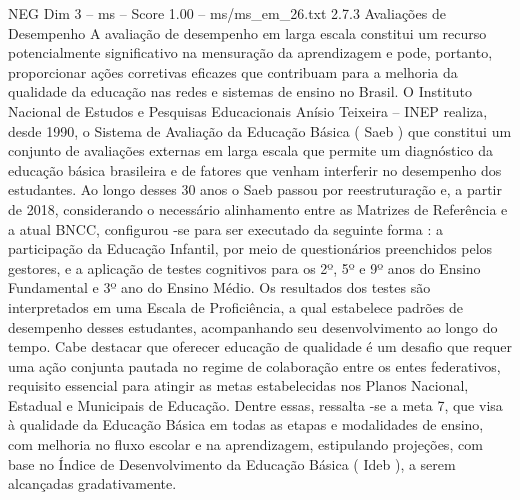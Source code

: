 \begin{textsample}{NEG Dim 3 – ms – Score 1.00 – ms/ms\_em\_26.txt}  \label{ex:f3_neg_097}
2.7.3 Avaliações de Desempenho A avaliação de desempenho em larga escala constitui um recurso potencialmente significativo na mensuração da aprendizagem e pode, portanto, proporcionar ações corretivas eficazes que contribuam para a melhoria da qualidade da educação nas redes e sistemas de ensino no Brasil.
O Instituto Nacional de Estudos e Pesquisas Educacionais Anísio Teixeira – INEP realiza, desde 1990, o Sistema de Avaliação da Educação Básica ( Saeb ) que constitui um conjunto de avaliações externas em larga escala que permite um diagnóstico da educação básica brasileira e de fatores que venham interferir no desempenho dos estudantes.
Ao longo desses 30 anos o Saeb passou por reestruturação e, a partir de 2018, considerando o necessário alinhamento entre as Matrizes de Referência e a atual BNCC, configurou -se para ser executado da seguinte forma : a participação da Educação Infantil, por meio de questionários preenchidos pelos gestores, e a aplicação de testes cognitivos para os 2º, 5º e 9º anos do Ensino Fundamental e 3º ano do Ensino Médio.
Os resultados dos testes são interpretados em uma Escala de Proficiência, a qual estabelece padrões de desempenho desses estudantes, acompanhando seu desenvolvimento ao longo do tempo.
Cabe destacar que oferecer educação de qualidade é um desafio que requer uma ação conjunta pautada no regime de colaboração entre os entes federativos, requisito essencial para atingir as metas estabelecidas nos Planos Nacional, Estadual e Municipais de Educação.
Dentre essas, ressalta -se a meta 7, que visa à qualidade da Educação Básica em todas as etapas e modalidades de ensino, com melhoria no fluxo escolar e na aprendizagem, estipulando projeções, com base no Índice de Desenvolvimento da Educação Básica ( Ideb ), a serem alcançadas gradativamente.

\end{textsample}
